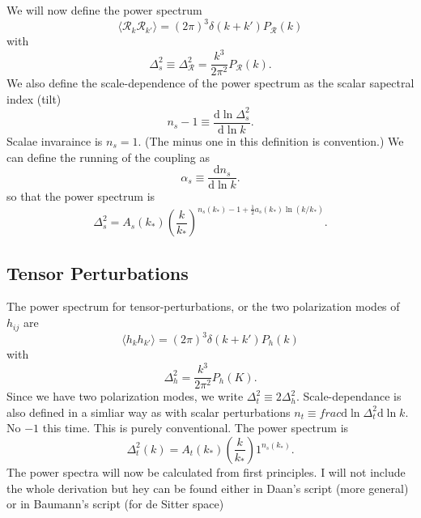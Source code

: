 \documentclass[12pt]{article}
\begin{document}
We will now define the power spectrum
\begin{equation}
    \langle \mathcal{R}_k \mathcal{R}_{k'} \rangle = (2\pi)^3 \delta (k + k') P_{\mathcal{R}}(k)
\end{equation}
with
\begin{equation}
    \Delta_s^2 \equiv \Delta_\mathcal{R}^2 = \frac{k^3}{2\pi^2}P_{\mathcal{R}}(k).
\end{equation}
We also define the scale-dependence of the power spectrum as the scalar sapectral index (tilt)
\begin{equation}
    n_s - 1 \equiv \frac{\mathrm{d}\ln \Delta_s^2}{\mathrm{d} \ln k}.
\end{equation}
Scalae invaraince is $n_s = 1$. (The minus one in this definition is convention.) We can define the running of the coupling as
\begin{equation}
    \alpha_s \equiv \frac{\mathrm{d}n_s}{\mathrm{d}\ln k}.
\end{equation}
so that the power spectrum is
\begin{equation}
    \Delta_s^2 = A_s(k_*)\left(\frac{k}{k_*}\right)^{n_s(k_*) - 1 + \frac{1}{2}a_s(k_*)\ln(k/k_*)}.
\end{equation}

\subsection{Tensor Perturbations}
The power spectrum for tensor-perturbations, or the two polarization modes of $h_{ij}$ are 
\begin{equation}
    \langle h_k h_{k'} \rangle = (2\pi)^3 \delta (k+k') P_h(k)
\end{equation}
with
\begin{equation}
    \Delta_h^2 = \frac{k^3}{2\pi^2} P_h(K).
\end{equation}
Since we have two polarization modes, we write $\Delta_t^2 \equiv 2 \Delta_h^2$. Scale-dependance is also defined in a simliar way as with scalar perturbations $n_t \equiv frac{\mathrm{d}\ln \Delta_t^2}{\mathrm{d} \ln k}$. No $-1$ this time. This is purely conventional. The power spectrum is 
\begin{equation}
    \Delta_t^2(k) = A_t(k_*)\left(\frac{k}{k_*}\right)1^{n_s(k_*)}.
\end{equation}
The power spectra will now be calculated from first principles. I will not include the whole derivation but hey can be found either in Daan's script (more general) or in Baumann's script (for de Sitter space)
\end{document}
